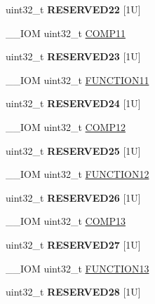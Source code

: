 \begin{DoxyCompactItemize}
uint32\+\_\+t {\bfseries R\+E\+S\+E\+R\+V\+E\+D22} \mbox{[}1\+U\mbox{]}
\item 
\+\_\+\+\_\+\+I\+OM uint32\+\_\+t \hyperlink{struct_d_w_t___type_aa199b91c854edd21ded38b8922d1e2a7}{C\+O\+M\+P11}
\item 
\mbox{\label{struct_d_w_t___type_ab3261dfc078ae8aaac1b096bda2cc15a}} 
uint32\+\_\+t {\bfseries R\+E\+S\+E\+R\+V\+E\+D23} \mbox{[}1\+U\mbox{]}
\item 
\+\_\+\+\_\+\+I\+OM uint32\+\_\+t \hyperlink{struct_d_w_t___type_a214f7478184150e43175c05aecad6c96}{F\+U\+N\+C\+T\+I\+O\+N11}
\item 
\mbox{\label{struct_d_w_t___type_a2cc26bd6d706077ca9cd56cc20ff2b9d}} 
uint32\+\_\+t {\bfseries R\+E\+S\+E\+R\+V\+E\+D24} \mbox{[}1\+U\mbox{]}
\item 
\+\_\+\+\_\+\+I\+OM uint32\+\_\+t \hyperlink{struct_d_w_t___type_a9115fd187d8cbcb9d6ec5eba938b81ea}{C\+O\+M\+P12}
\item 
\mbox{\label{struct_d_w_t___type_a1ff4d863ad093166492d59615592f0e1}} 
uint32\+\_\+t {\bfseries R\+E\+S\+E\+R\+V\+E\+D25} \mbox{[}1\+U\mbox{]}
\item 
\+\_\+\+\_\+\+I\+OM uint32\+\_\+t \hyperlink{struct_d_w_t___type_a521771b3dfe2ea48463e1e91d01448b6}{F\+U\+N\+C\+T\+I\+O\+N12}
\item 
\mbox{\label{struct_d_w_t___type_a985a01a8b63bcf2f338b3391055f6163}} 
uint32\+\_\+t {\bfseries R\+E\+S\+E\+R\+V\+E\+D26} \mbox{[}1\+U\mbox{]}
\item 
\+\_\+\+\_\+\+I\+OM uint32\+\_\+t \hyperlink{struct_d_w_t___type_abc29ac14df61ec3f8f3d28ca92892d8a}{C\+O\+M\+P13}
\item 
\mbox{\label{struct_d_w_t___type_a0bb401cc8542799048ba8eecc41d5d97}} 
uint32\+\_\+t {\bfseries R\+E\+S\+E\+R\+V\+E\+D27} \mbox{[}1\+U\mbox{]}
\item 
\+\_\+\+\_\+\+I\+OM uint32\+\_\+t \hyperlink{struct_d_w_t___type_af9ea0b56769614c5c5699003b3df39f0}{F\+U\+N\+C\+T\+I\+O\+N13}
\item 
\mbox{\label{struct_d_w_t___type_a2b357b17d47a4d526f6b26c6891c21da}} 
uint32\+\_\+t {\bfseries R\+E\+S\+E\+R\+V\+E\+D28} \mbox{[}1\+U\mbox{]}

\end{DoxyCompactItemize}

